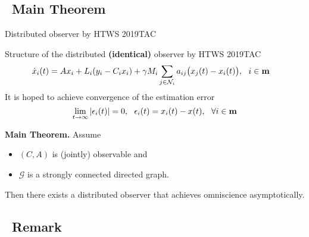\documentclass{beamer}
\begin{document}
\subsection{~Main Theorem}%

\begin{frame}{\color{blue} Distributed observer by HTWS 2019TAC}

Structure of the distributed \textbf{(identical)} observer by HTWS 2019TAC
\begin{align*}
\dot{x}_{i}(t)&=A x_{i} +L_{i}(y_{i}-C_{i}x_{i})+\gamma M_{i} \sum_{j\in\mathcal{N}_{i}} a_{ij}\big(x_{j}(t)-x_{i}(t) \big),~~ i\in{\bf m}
\end{align*}
It is hoped to achieve convergence of the estimation error
\begin{equation*}
\lim_{t\rightarrow\infty} |\epsilon_{i}(t)|=0,~~ \epsilon_{i}(t)=x_{i}(t)-x(t),~~ \forall i\in{\bf m}
\end{equation*}

\textbf{Main Theorem.} Assume
\begin{itemize}
  \item $(C,A)$ is (jointly) observable and
  \item $\mathcal{G}$ is a strongly connected directed graph.
\end{itemize}
Then there exists a distributed observer that achieves omniscience asymptotically.


\end{frame}






\subsection{~Remark}%
\end{document}
